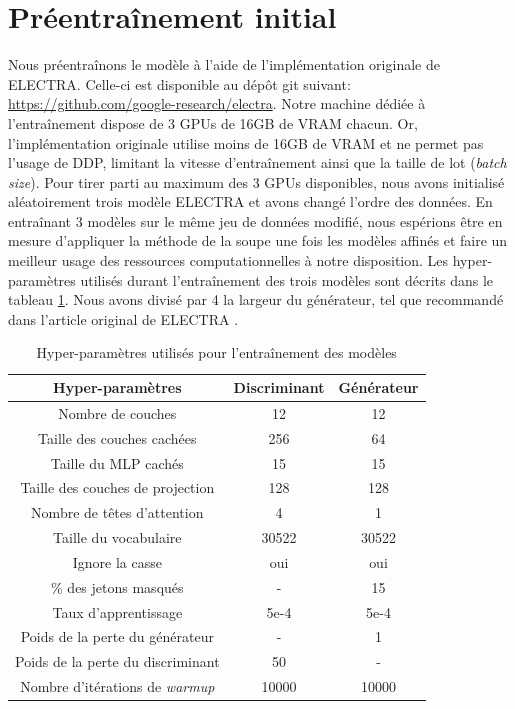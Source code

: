 \documentclass[12pt,twoside,maitrise]{dms}
\theoremstyle{definition}
\numberwithin{equation}{section}
\numberwithin{table}{chapter}
\numberwithin{figure}{chapter}
\begin{document}
\section{Préentraînement initial}
Nous préentraînons le modèle à l'aide de l'implémentation originale de ELECTRA.
Celle-ci est disponible au dépôt git suivant:
\url{https://github.com/google-research/electra}. Notre machine dédiée à
l'entraînement dispose de 3 GPUs de 16GB de VRAM chacun. Or, l'implémentation
originale utilise moins de 16GB de VRAM et ne permet pas l'usage de DDP,
limitant la vitesse d'entraînement ainsi que la taille de lot (\textit{batch
	size}). Pour tirer parti au maximum des 3 GPUs disponibles, nous avons
initialisé aléatoirement trois modèle ELECTRA et avons changé l'ordre des
données. En entraînant 3 modèles sur le même jeu de données modifié, nous
espérions être en mesure d'appliquer la méthode de la soupe \cite{soup} une
fois les modèles affinés et faire un meilleur usage des ressources
computationnelles à notre disposition. Les hyper-paramètres utilisés durant
l'entraînement des trois modèles sont décrits dans le tableau \ref{table:hp}.
Nous avons divisé par 4 la largeur du générateur, tel que recommandé dans
l'article original de ELECTRA \cite{clark2020electrapretrainingtextencoders}.


\begin{table}[h!]
	\centering
	\begin{tabular}{||c | c c||}
		\hline
		Hyper-paramètres                       & Discriminant & Générateur \\ [0.5ex]
		\hline\hline
		Nombre de couches                      & 12           & 12         \\
		Taille des couches cachées             & 256          & 64         \\
		Taille du MLP cachés                   & 15           & 15         \\
		Taille des couches de projection       & 128          & 128        \\
		Nombre de têtes d'attention            & 4            & 1          \\
		Taille du vocabulaire                  & 30522        & 30522      \\
		Ignore la casse                        & oui          & oui        \\
		\% des jetons masqués                  & -            & 15         \\
		Taux d'apprentissage                   & 5e-4         & 5e-4       \\
		Poids de la perte du générateur        & -            & 1          \\
		Poids de la perte du discriminant      & 50           & -          \\
		Nombre d'itérations de \textit{warmup} & 10000        & 10000      \\
		\hline
	\end{tabular}
	\caption{Hyper-paramètres utilisés pour l'entraînement des modèles}
	\label{table:hp}
\end{table}
\end{document}
